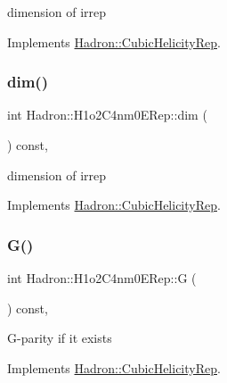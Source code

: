 dimension of irrep 

Implements \mbox{\hyperlink{structHadron_1_1CubicHelicityRep_a95d229a05580e65f8bdde74a1e316855}{Hadron\+::\+Cubic\+Helicity\+Rep}}.

\mbox{\label{structHadron_1_1H1o2C4nm0ERep_a9c5abe37865ed4889e2411425733e664}} 
\subsubsection{\texorpdfstring{dim()}{dim()}\hspace{0.1cm}{\footnotesize\ttfamily [3/3]}}
{\footnotesize\ttfamily int Hadron\+::\+H1o2\+C4nm0\+E\+Rep\+::dim (\begin{DoxyParamCaption}{ }\end{DoxyParamCaption}) const\hspace{0.3cm}{\ttfamily [inline]}, {\ttfamily [virtual]}}

dimension of irrep 

Implements \mbox{\hyperlink{structHadron_1_1CubicHelicityRep_a95d229a05580e65f8bdde74a1e316855}{Hadron\+::\+Cubic\+Helicity\+Rep}}.

\mbox{\label{structHadron_1_1H1o2C4nm0ERep_a27d3efda696f16d6a2aa6ed3c3a9daf9}} 
\subsubsection{\texorpdfstring{G()}{G()}\hspace{0.1cm}{\footnotesize\ttfamily [1/3]}}
{\footnotesize\ttfamily int Hadron\+::\+H1o2\+C4nm0\+E\+Rep\+::G (\begin{DoxyParamCaption}{ }\end{DoxyParamCaption}) const\hspace{0.3cm}{\ttfamily [inline]}, {\ttfamily [virtual]}}

G-\/parity if it exists 

Implements \mbox{\hyperlink{structHadron_1_1CubicHelicityRep_a50689f42be1e6170aa8cf6ad0597018b}{Hadron\+::\+Cubic\+Helicity\+Rep}}.

\mbox{\label{structHadron_1_1H1o2C4nm0ERep_a27d3efda696f16d6a2aa6ed3c3a9daf9}} 
